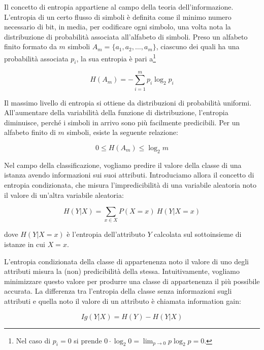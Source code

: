 \documentclass[a4paper,11pt,twoside,openright,fleqn]{book}
\begin{document}
Il concetto di entropia appartiene al campo della teoria dell'informazione. L'entropia di un certo flusso di simboli è definita come il minimo numero necessario di bit, in media, per codificare ogni simbolo, una volta nota la distribuzione di probabilità associata all'alfabeto di simboli. Preso un alfabeto finito formato da $m$ simboli $A_m = \{a_1, a_2, \dots, a_m\}$, ciascuno dei quali ha una probabilità associata $p_i$, la sua entropia è pari a\footnote{Nel caso di $p_i = 0$ si prende $\displaystyle 0 \cdot \log_2 0 = \lim_{p \to 0} p \log_2 p = 0$.}

\begin{equation}
H(A_m) = -\sum_{i=1}^m p_i \log_2 p_i
\end{equation}

Il massimo livello di entropia si ottiene da distribuzioni di probabilità uniformi. All'aumentare della variabilità della funzione di distribuzione, l'entropia diminuisce, perché i simboli in arrivo sono più facilmente predicibili. Per un alfabeto finito di $m$ simboli, esiste la seguente relazione:

\begin{equation}
0 \leq H(A_m) \leq \log_2 m
\end{equation}

Nel campo della classificazione, vogliamo predire il valore della classe di una istanza avendo informazioni sui suoi attributi. Introduciamo allora il concetto di entropia condizionata, che misura l'impredicibilità di una variabile aleatoria noto il valore di un'altra variabile aleatoria:

\begin{equation}
H(Y|X) = \sum_{x\in X} P(X=x) \: H(Y|X=x)
\end{equation}

dove $H(Y|X=x)$ è l'entropia dell'attributo $Y$ calcolata sul sottoinsieme di istanze in cui $X=x$.

L'entropia condizionata della classe di appartenenza noto il valore di uno degli attributi misura la (non) predicibilità della stessa. Intuitivamente, vogliamo minimizzare questo valore per produrre una classe di appartenenza il più possibile accurata. La differenza tra l'entropia della classe senza informazioni sugli attributi e quella noto il valore di un attributo è chiamata information gain:

\begin{equation}
\textit{Ig}(Y|X) = H(Y) - H(Y|X)
\end{equation}
\end{document}
